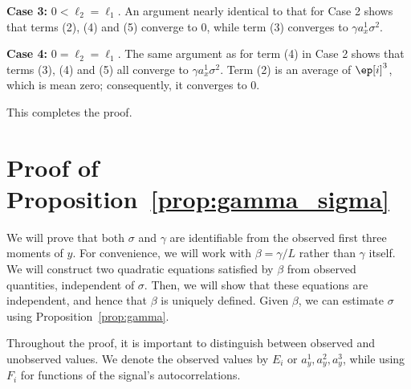 \documentclass[9pt,twocolumn,twoside,lineno]{pnas-new}
\begin{document}
{\bf Case 3:} $0<\ell_2 = \ell_1$. An argument nearly identical to that for Case 2 shows that terms (2), (4) and (5) converge to 0, while term (3) converges to $\gamma a_x^1 \sigma^2$.

{\bf Case 4:} $0=\ell_2 = \ell_1$. The same argument as for term (4) in Case 2 shows that terms (3), (4) and (5) all converge to $\gamma a_x^1 \sigma^2$. Term (2) is an average of $\ep[i]^3$, which is mean zero; consequently, it converges to 0.

This completes the proof.

\section{Proof of Proposition~\ref{prop:gamma_sigma}} \label{sec:proof_prop_gamma_sigma}

We will prove that both $\sigma$ and $\gamma$ are identifiable from the observed first three moments of $y$. For convenience, we will work with $\beta = \gamma / L$ rather than $\gamma$ itself. We will construct two quadratic equations satisfied by $\beta$ from observed quantities, independent of $\sigma$. Then, we will show that these equations are independent, and hence that $\beta$ is uniquely defined.  Given $\beta$, we can estimate $\sigma$ using Proposition~\ref{prop:gamma}.

Throughout the proof, it is important to distinguish between observed and unobserved values. 
We denote the observed values by $E_i$ or $a_y^1,a_y^2,a_y^3$, while using $F_i$ for functions of the signal's autocorrelations. 
\end{document}
